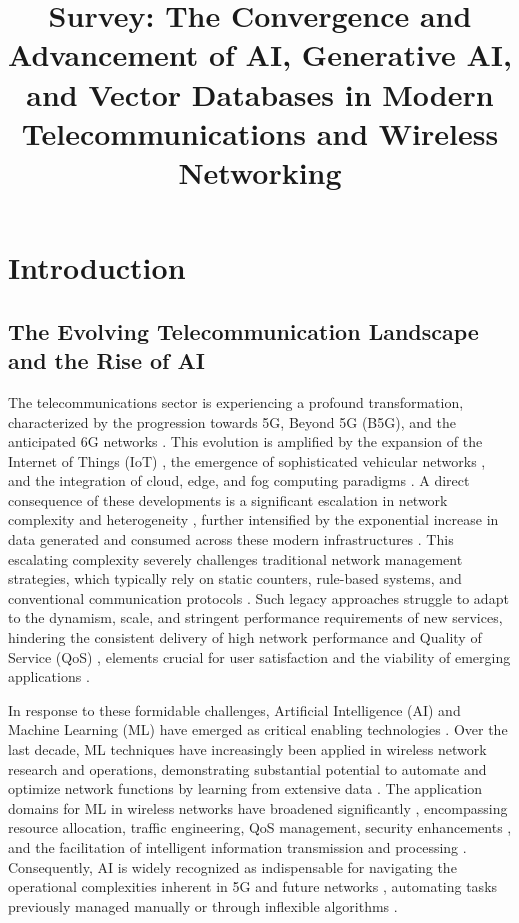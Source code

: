 \documentclass[sigconf]{acmart}
\title{Survey: The Convergence and Advancement of AI, Generative AI, and Vector Databases in Modern Telecommunications and Wireless Networking}
\begin{document}
\maketitle
\section{Introduction}

\subsection{The Evolving Telecommunication Landscape and the Rise of AI}
\label{sec:intro_landscape}

The telecommunications sector is experiencing a profound transformation, characterized by the progression towards 5G, Beyond 5G (B5G), and the anticipated 6G networks \cite{ref7, ref9, ref17, ref34}. This evolution is amplified by the expansion of the Internet of Things (IoT) \cite{ref15, ref26}, the emergence of sophisticated vehicular networks \cite{ref25}, and the integration of cloud, edge, and fog computing paradigms \cite{ref3, ref14, ref25, ref31}. A direct consequence of these developments is a significant escalation in network complexity and heterogeneity \cite{ref6, ref9, ref17, ref25, ref27}, further intensified by the exponential increase in data generated and consumed across these modern infrastructures \cite{ref27}. This escalating complexity severely challenges traditional network management strategies, which typically rely on static counters, rule-based systems, and conventional communication protocols \cite{ref17, ref21, ref25, ref28, ref32}. Such legacy approaches struggle to adapt to the dynamism, scale, and stringent performance requirements of new services, hindering the consistent delivery of high network performance and Quality of Service (QoS) \cite{ref11}, elements crucial for user satisfaction and the viability of emerging applications \cite{ref1, ref11}.

In response to these formidable challenges, Artificial Intelligence (AI) and Machine Learning (ML) have emerged as critical enabling technologies \cite{ref12, ref17, ref20, ref25, ref26}. Over the last decade, ML techniques have increasingly been applied in wireless network research and operations, demonstrating substantial potential to automate and optimize network functions by learning from extensive data \cite{ref1, ref12, ref32}. The application domains for ML in wireless networks have broadened significantly \cite{ref1}, encompassing resource allocation, traffic engineering, QoS management, security enhancements \cite{ref12}, and the facilitation of intelligent information transmission and processing \cite{ref32}. Consequently, AI is widely recognized as indispensable for navigating the operational complexities inherent in 5G and future networks \cite{ref6, ref9, ref25}, automating tasks previously managed manually or through inflexible algorithms \cite{ref28}.
\end{document}
